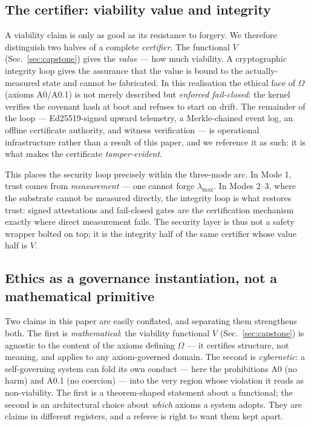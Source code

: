 \documentclass[11pt, a4paper]{article}
\begin{document}
\subsection{The certifier: viability value and integrity}
\label{sec:certifier}

A viability claim is only as good as its resistance to forgery. We therefore
distinguish two halves of a complete \emph{certifier}. The functional $V$
(Sec.~\ref{sec:capstone}) gives the \emph{value} --- how much viability. A
cryptographic integrity loop gives the assurance that the value is bound to the
actually-measured state and cannot be fabricated. In this realisation the ethical
face of $\Omega$ (axioms A0/A0.1) is not merely described but \emph{enforced
fail-closed}: the kernel verifies the covenant hash at boot and refuses to start
on drift. The remainder of the loop --- Ed25519-signed upward telemetry, a
Merkle-chained event log, an offline certificate authority, and witness
verification --- is operational infrastructure rather than a result of this
paper, and we reference it as such: it is what makes the certificate
\emph{tamper-evident}.

This places the security loop precisely within the three-mode arc. In Mode 1,
trust comes from \emph{measurement} --- one cannot forge $\lambda_\text{max}$. In
Modes 2--3, where the substrate cannot be measured directly, the integrity loop
is what restores trust: signed attestations and fail-closed gates are the
certification mechanism exactly where direct measurement fails. The security
layer is thus not a safety wrapper bolted on top; it is the integrity half of
the same certifier whose value half is $V$.

\subsection{Ethics as a governance instantiation, not a mathematical primitive}
\label{sec:governance_instantiation}

Two claims in this paper are easily conflated, and separating them strengthens
both. The first is \emph{mathematical}: the viability functional $V$
(Sec.~\ref{sec:capstone}) is agnostic to the content of the axioms defining
$\Omega$ --- it certifies structure, not meaning, and applies to any
axiom-governed domain. The second is \emph{cybernetic}: a self-governing system
can fold its own conduct --- here the prohibitions A0 (no harm) and A0.1 (no
coercion) --- into the very region whose violation it reads as non-viability.
The first is a theorem-shaped statement about a functional; the second is an
architectural choice about \emph{which} axioms a system adopts. They are claims
in different registers, and a referee is right to want them kept apart.
\end{document}
